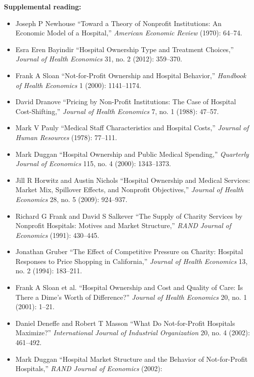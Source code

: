 \documentclass[11pt,]{article}
\providecommand{\tightlist}{%
  \setlength{\itemsep}{0pt}\setlength{\parskip}{0pt}}
\begin{document}
\textbf{Supplemental reading:}

\begin{itemize}
\tightlist
\item
  Joseph P Newhouse {``Toward a Theory of Nonprofit Institutions: {An}
  Economic Model of a Hospital,''} \emph{American Economic Review}
  (1970): 64--74.
\item
  Esra Eren Bayindir {``Hospital Ownership Type and Treatment
  Choices,''} \emph{Journal of Health Economics} 31, no. 2 (2012):
  359--370.
\item
  Frank A Sloan {``Not-for-Profit Ownership and Hospital Behavior,''}
  \emph{Handbook of Health Economics} 1 (2000): 1141--1174.
\item
  David Dranove {``Pricing by Non-Profit Institutions: The Case of
  Hospital Cost-Shifting,''} \emph{Journal of Health Economics} 7, no. 1
  (1988): 47--57.
\item
  Mark V Pauly {``Medical Staff Characteristics and Hospital Costs,''}
  \emph{Journal of Human Resources} (1978): 77--111.
\item
  Mark Duggan {``Hospital {Ownership} and {Public} {Medical}
  {Spending},''} \emph{Quarterly Journal of Economics} 115, no. 4
  (2000): 1343--1373.
\item
  Jill R Horwitz and Austin Nichols {``Hospital Ownership and Medical
  Services: Market Mix, Spillover Effects, and Nonprofit Objectives,''}
  \emph{Journal of Health Economics} 28, no. 5 (2009): 924--937.
\item
  Richard G Frank and David S Salkever {``The Supply of Charity Services
  by Nonprofit Hospitals: Motives and Market Structure,''} \emph{RAND
  Journal of Economics} (1991): 430--445.
\item
  Jonathan Gruber {``The Effect of Competitive Pressure on Charity:
  {Hospital} Responses to Price Shopping in {California},''}
  \emph{Journal of Health Economics} 13, no. 2 (1994): 183--211.
\item
  Frank A Sloan et al. {``Hospital Ownership and Cost and Quality of
  Care: Is There a Dime's Worth of Difference?''} \emph{Journal of
  Health Economics} 20, no. 1 (2001): 1--21.
\item
  Daniel Deneffe and Robert T Masson {``What Do Not-for-Profit Hospitals
  Maximize?''} \emph{International Journal of Industrial Organization}
  20, no. 4 (2002): 461--492.
\item
  Mark Duggan {``Hospital Market Structure and the Behavior of
  Not-for-Profit Hospitals,''} \emph{RAND Journal of Economics} (2002):

\end{itemize}
\end{document}
